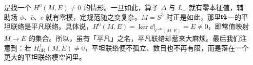 是找一个 $H^0(M,E)\neq0$ 的情形。一旦如此，算子 $\Delta$ 与 $L_-$ 就有零本征值，辅助场 $\phi$、$\bar c$、$c$ 就有零模，定规范随之变复杂。$M=S^3$ 时正是如此，那里唯一的平坦联络是平凡联络。具体说，$H^0(M,E)=\ker\dd|_{C^\infty(M,E)}=E\neq0$，即常值映射 $M\to E$ 的集合。所以，虽有「平凡」之名，平凡联络却惹来大麻烦。最后我们注意到：若 $H^1_{\mathrm{dR}}(M,E)\neq0$，平坦联络便不孤立、数目也不再有限，而是落在一个更大的平坦联络模空间里。

